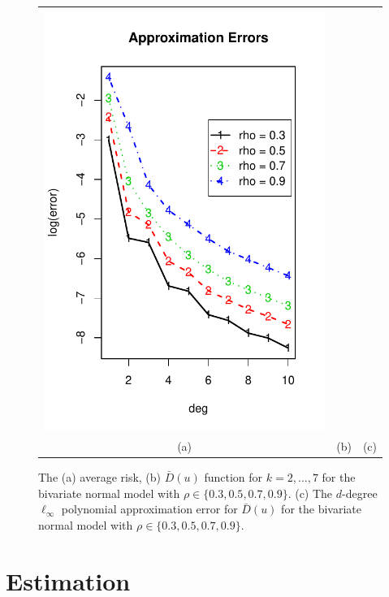\documentclass[12pt]{article}
\begin{document}
\begin{figure}[h]
\begin{tabular}{ccc}
\includegraphics[scale = 0.45, clip = true, trim = 0.05in 0 0.2in 0.6in]{illus_approx_errors.pdf}\\
(a) & (b) & (c)
\end{tabular}

\caption{
The (a) average risk, (b) $\bar{D}(u)$ function for $k = 2,\hdots, 7$ for the bivariate normal model with $\rho \in \{0.3, 0.5, 0.7, 0.9\}$.
(c) The $d$-degree $\ell_\infty$ polynomial approximation error for $\bar{D}(u)$ for the bivariate normal model with $\rho \in \{0.3, 0.5, 0.7, 0.9\}$.
}\label{fig:toy4}
\end{figure}

\section{Estimation}\label{sec:extrapolation_estimation}
\end{document}
